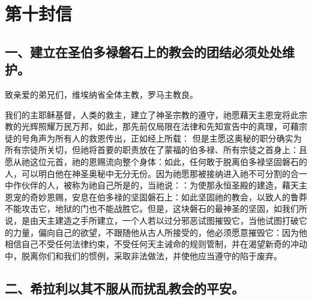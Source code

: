 

\section{第十封信}

\par


\subsection{一、建立在圣伯多禄磐石上的教会的团结必须处处维护。}

致亲爱的弟兄们，维埃纳省全体主教，罗马主教良。\par

我们的主耶稣基督，人类的救主，建立了神圣宗教的遵守，祂愿藉天主恩宠将此宗教的光辉照耀万民万邦，如此，那先前仅局限在法律和先知宣告中的真理，可藉宗徒的号角声为所有人的救恩传出，正如经上所载： 但是主愿这奥秘的职分确实为所有宗徒所关切，但祂将首要的职责放在了蒙福的伯多禄、所有宗徒之首身上：且愿从祂这位元首，祂的恩赐流向整个身体：如此，任何敢于脱离伯多禄坚固磐石的人，可以明白他在神圣奥秘中无分无份。因为祂愿那被接纳进入祂不可分割的合一中作伙伴的人，被称为祂自己所是的，当祂说：：为使那永恒圣殿的建造，藉天主恩宠的奇妙恩赐，安息在伯多禄的坚固磐石上：如此坚固祂的教会，以致人的鲁莽不能攻击它，地狱的门也不能战胜它。但是，这块磐石的最神圣的坚固，如我们所说，是由天主建造之手所建立，一个人若以过分邪恶试图摧毁它，当他试图打破它的力量，偏向自己的欲望，不跟随他从古人所接受的，他必须愿意摧毁它：因为他相信自己不受任何法律约束，不受任何天主诫命的规则管制，并在渴望新奇的冲动中，脱离你们和我们的惯例，采取非法做法，并使他应当遵守的陷于废弃。\par


\subsection{二、希拉利以其不服从而扰乱教会的平安。}

